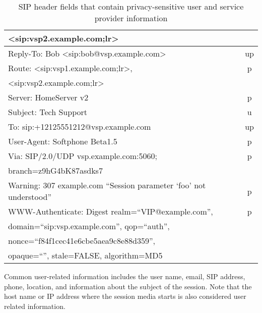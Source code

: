 \documentclass[letterpaper,notitlepage,times,12pt]{article}
\begin{document}
\begin{table}[!th]
\begin{center}
\begin{tabular}{|l|c|}
{\sf \hspace{10pt} \textless sip:vsp2.example.com;lr\textgreater} & \\ \hline
{\sf Reply-To: Bob \textless sip:bob@vsp.example.com\textgreater} & up \\ \hline
{\sf Route: \textless sip:vsp1.example.com;lr\textgreater,} & p \\
{\sf \hspace{10pt} \textless sip:vsp2.example.com;lr\textgreater} & \\ \hline
{\sf Server: HomeServer v2} & p \\ \hline
{\sf Subject: Tech Support} & u \\ \hline
{\sf To: sip:+12125551212@vsp.example.com} & up \\ \hline
{\sf User-Agent: Softphone Beta1.5} & p \\ \hline
{\sf Via: SIP/2.0/UDP vsp.example.com:5060;} & p \\
{\sf \hspace{10pt} branch=z9hG4bK87asdks7} & \\ \hline
{\sf Warning: 307 example.com ``Session parameter `foo' not understood''} & p \\ \hline
{\sf WWW-Authenticate: Digest realm=``VIP@example.com'',} & p \\
{\sf \hspace{10pt} domain=``sip:vsp.example.com'', qop=``auth'',} & \\
{\sf \hspace{10pt} nonce=``f84f1cec41e6cbe5aea9c8e88d359'',} & \\
{\sf \hspace{10pt} opaque=``'', stale=FALSE, algorithm=MD5} & \\ \hline
\end{tabular}
\end{center}
\caption{SIP header fields that contain privacy-sensitive user and service provider information}\label{tab:siphdreg}
\end{table}

Common user-related information includes the user name, email, SIP address, phone, location, and information about the subject of the session. Note that the host name or IP address where the session media starts is also considered user related information.
\end{document}
